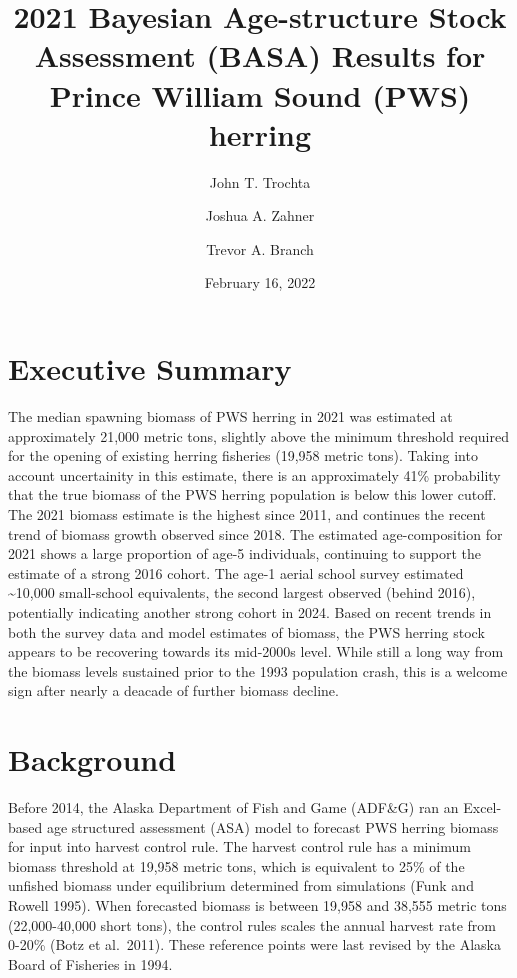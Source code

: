 \documentclass[
  11pt,
]{article}
\title{2021 Bayesian Age-structure Stock Assessment (BASA) Results for
Prince William Sound (PWS) herring}
\author{John T. Trochta \and Joshua A. Zahner \and Trevor A. Branch}
\date{February 16, 2022}
\begin{document}
\maketitle

\hypertarget{executive-summary}{%
\section{Executive Summary}\label{executive-summary}}

The median spawning biomass of PWS herring in 2021 was estimated at
approximately 21,000 metric tons, slightly above the minimum threshold
required for the opening of existing herring fisheries (19,958 metric
tons). Taking into account uncertainity in this estimate, there is an
approximately 41\% probability that the true biomass of the PWS herring
population is below this lower cutoff. The 2021 biomass estimate is the
highest since 2011, and continues the recent trend of biomass growth
observed since 2018. The estimated age-composition for 2021 shows a
large proportion of age-5 individuals, continuing to support the
estimate of a strong 2016 cohort. The age-1 aerial school survey
estimated \textasciitilde10,000 small-school equivalents, the second
largest observed (behind 2016), potentially indicating another strong
cohort in 2024. Based on recent trends in both the survey data and model
estimates of biomass, the PWS herring stock appears to be recovering
towards its mid-2000s level. While still a long way from the biomass
levels sustained prior to the 1993 population crash, this is a welcome
sign after nearly a deacade of further biomass decline.

\hypertarget{background}{%
\section{Background}\label{background}}

Before 2014, the Alaska Department of Fish and Game (ADF\&G) ran an
Excel-based age structured assessment (ASA) model to forecast PWS
herring biomass for input into harvest control rule. The harvest control
rule has a minimum biomass threshold at 19,958 metric tons, which is
equivalent to 25\% of the unfished biomass under equilibrium determined
from simulations (Funk and Rowell 1995). When forecasted biomass is
between 19,958 and 38,555 metric tons (22,000-40,000 short tons), the
control rules scales the annual harvest rate from 0-20\% (Botz et
al.~2011). These reference points were last revised by the Alaska Board
of Fisheries in 1994.
\end{document}
